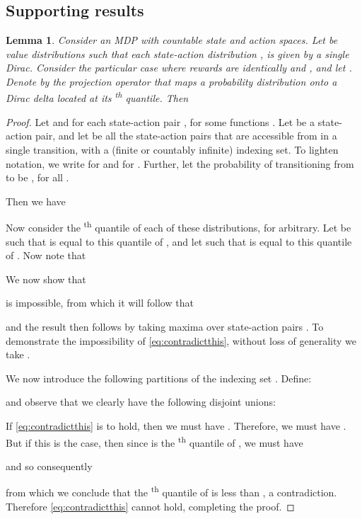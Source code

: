 \documentclass[letterpaper]{article}
\newtheorem{lem}{Lemma}
\begin{document}
\subsection{Supporting results}

\begin{lem}\label{lem:1DiracCase}Consider an MDP with countable state and action spaces.
Let  be value distributions such that each state-action distribution ,  is given by a single Dirac. Consider the particular case where rewards are identically  and , and let . Denote by  the projection operator that maps a probability distribution onto a Dirac delta located at its \textsuperscript{th} quantile. Then

\end{lem}
\begin{proof}
Let  and  for each state-action pair , for some functions . Let  be a state-action pair, and let  be all the state-action pairs that are accessible from  in a single transition, with  a (finite or countably infinite) indexing set.
To lighten notation, we write  for  and  for . Further, let the probability of transitioning from  to  be , for all .

Then we have

Now consider the \textsuperscript{th} quantile of each of these distributions, for  arbitrary. Let  be such that  is equal to this quantile of , and let  such that  is equal to this quantile of . Now note that

We now show that 

is impossible, from which it will follow that

and the result then follows by taking maxima over state-action pairs .
To demonstrate the impossibility of \eqref{eq:contradictthis}, 
without loss of generality we take . 

We now introduce the following partitions of the indexing set . Define:

and observe that we clearly have the following disjoint unions:

If \eqref{eq:contradictthis} is to hold, then we must have . Therefore, we must have . But if this is the case, then since  is the \textsuperscript{th} quantile of , we must have

and so consequently

from which we conclude that the \textsuperscript{th} quantile of  is less than , a contradiction. Therefore \eqref{eq:contradictthis} cannot hold, completing the proof.
\end{proof}
\end{document}
